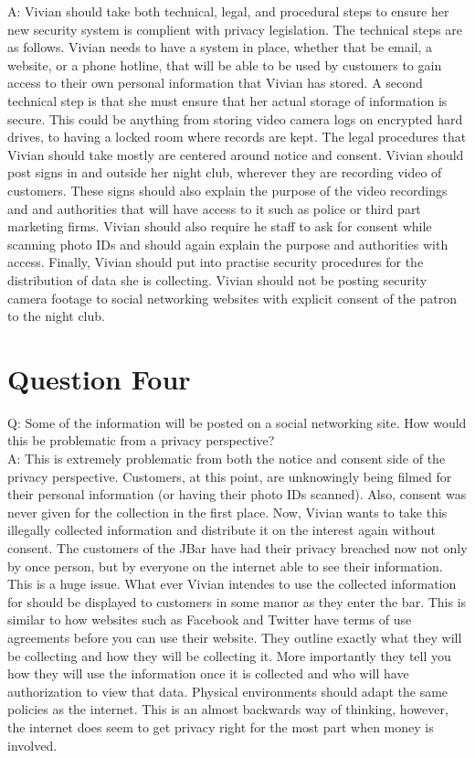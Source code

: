 \documentclass[paper=a4, fontsize=11pt]{scrartcl} %
\numberwithin{equation}{section} %
\numberwithin{figure}{section} %
\numberwithin{table}{section} %
\begin{document}
A: Vivian should take both technical, legal, and procedural steps to ensure her new security system is complient with privacy legislation.
The technical steps are as follows. Vivian needs to have a system in place, whether that be email, a website, or a phone hotline, that will
be able to be used by customers to gain access to their own personal information that Vivian has stored. A second technical step is that
she must ensure that her actual storage of information is secure. This could be anything from storing video camera logs on encrypted hard
drives, to having a locked room where records are kept. The legal procedures that Vivian should take mostly are centered around notice and
consent. Vivian should post signs in and outside her night club, wherever they are recording video of customers. These signs should also
explain the purpose of the video recordings and and authorities that will have access to it such as police or third part marketing firms.
Vivian should also require he staff to ask for consent while scanning photo IDs and should again explain the purpose and authorities with
access. Finally, Vivian should put into practise security procedures for the distribution of data she is collecting. Vivian should not be
posting security camera footage to social networking websites with explicit consent of the patron to the night club.


\section{Question Four}

Q: Some of the information will be posted on a social networking site. How would this be problematic from a privacy perspective?\\

A: This is extremely problematic from both the notice and consent side of the privacy perspective. Customers, at this point, are
unknowingly being filmed for their personal information (or having their photo IDs scanned). Also, consent was never given for
the collection in the first place. Now, Vivian wants to take this illegally collected information and distribute it on the interest
again without consent. The customers of the JBar have had their privacy breached now not only by once person, but by everyone
on the internet able to see their information. This is a huge issue. What ever Vivian intendes to use the collected information for
should be displayed to customers in some manor as they enter the bar. This is similar to how websites such as Facebook and Twitter
have terms of use agreements before you can use their website. They outline exactly what they will be collecting and how they will
be collecting it. More importantly they tell you how they will use the information once it is collected and who will have authorization
to view that data. Physical environments should adapt the same policies as the internet. This is an almost backwards way of thinking,
however, the internet does seem to get privacy right for the most part when money is involved.
\end{document}
